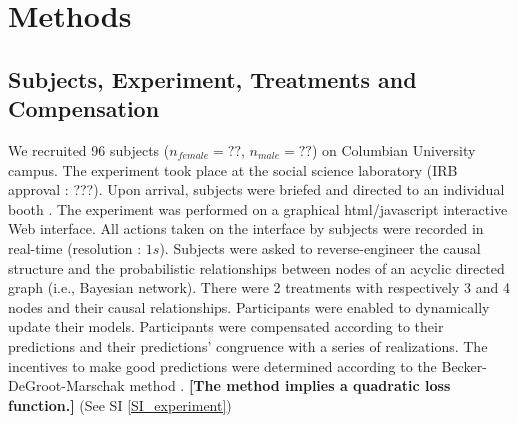 \section*{Methods}
\subsection*{Subjects, Experiment, Treatments and Compensation}
We recruited 96 subjects ($n_{female} = ??$, $n_{male} = ??$) on Columbian University campus. The experiment took place at the social science laboratory (IRB approval : ???). Upon arrival, subjects were briefed and directed to an individual booth . The experiment was performed on a graphical  html/javascript interactive Web interface. All actions taken on the interface by subjects were recorded in real-time (resolution : $1s$). Subjects were asked to reverse-engineer the causal structure and the probabilistic relationships between nodes of an acyclic directed graph (i.e., Bayesian network). There were 2 treatments with respectively 3 and 4 nodes and their causal relationships. Participants were enabled to dynamically update their models. Participants were compensated according to their predictions and their predictions' congruence with a series of realizations.  The incentives to make good predictions were determined according to the Becker-DeGroot-Marschak method \cite{becker1964measuring}. {\bf  [The method implies a quadratic loss function.]} (See SI \ref{SI_experiment})
